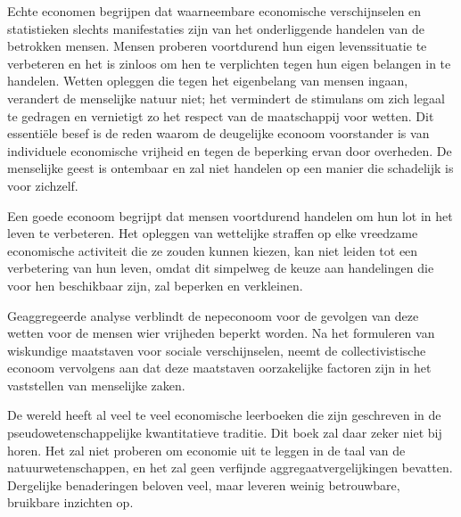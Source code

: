 Echte economen begrijpen dat waarneembare economische verschijnselen en statistieken slechts manifestaties zijn van het onderliggende handelen van de betrokken mensen. Mensen proberen voortdurend hun eigen levenssituatie te verbeteren en het is zinloos om hen te verplichten tegen hun eigen belangen in te handelen. Wetten opleggen die tegen het eigenbelang van mensen ingaan, verandert de menselijke natuur niet; het vermindert de stimulans om zich legaal te gedragen en vernietigt zo het respect van de maatschappij voor wetten. Dit essentiële besef is de reden waarom de deugelijke econoom voorstander is van individuele economische vrijheid en tegen de beperking ervan door overheden. De menselijke geest is ontembaar en zal niet handelen op een manier die schadelijk is voor zichzelf.

Een goede econoom begrijpt dat mensen voortdurend handelen om hun lot in het leven te verbeteren. Het opleggen van wettelijke straffen op elke vreedzame economische activiteit die ze zouden kunnen kiezen, kan niet leiden tot een verbetering van hun leven, omdat dit simpelweg de keuze aan handelingen die voor hen beschikbaar zijn, zal beperken en verkleinen.

Geaggregeerde analyse verblindt de nepeconoom voor de gevolgen van deze wetten voor de mensen wier vrijheden beperkt worden. Na het formuleren van wiskundige maatstaven voor sociale verschijnselen, neemt de collectivistische econoom vervolgens aan dat deze maatstaven oorzakelijke factoren zijn in het vaststellen van menselijke zaken.

De wereld heeft al veel te veel economische leerboeken die zijn geschreven in de pseudowetenschappelijke kwantitatieve traditie. Dit boek zal daar zeker niet bij horen. Het zal niet proberen om economie uit te leggen in de taal van de natuurwetenschappen, en het zal geen verfijnde aggregaatvergelijkingen bevatten. Dergelijke benaderingen beloven veel, maar leveren weinig betrouwbare, bruikbare inzichten op.
